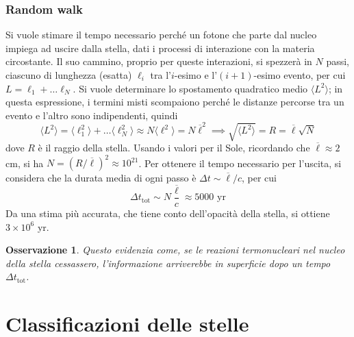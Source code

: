 \documentclass[11pt, a4paper]{scrartcl}
\theoremstyle{style}
\newtheorem{osservazione}{Osservazione}[section]
\theoremstyle{style1}
\numberwithin{equation}{subsection}
\begin{document}
\subsubsection{Random walk}

Si vuole stimare il tempo necessario perch\'e un fotone che parte dal nucleo impiega ad uscire dalla stella, dati i processi di interazione con la materia circostante.
Il suo cammino, proprio per queste interazioni, si spezzer\`a in $N$ passi, ciascuno di lunghezza (esatta) $\ell _i$ tra l'$i$-esimo e l'$(i+1)$-esimo evento, per cui $L = \ell _1 + \ldots \ell _N$.
Si vuole determinare lo spostamento quadratico medio $\langle L^2 \rangle$; in questa espressione, i termini misti scompaiono perch\'e le distanze percorse tra un evento e l'altro sono indipendenti, quindi
\[
\langle L^2 \rangle = \langle \ell _1^2 \rangle + \ldots \langle \ell _{N} ^2 \rangle \approx N \langle  \ell ^2 \rangle = N \overline{\ell }^2\implies \sqrt{\langle L^2 \rangle}  = R = \overline{\ell } \sqrt{N} 
\] 
dove $R$ \`e il raggio della stella.
Usando i valori per il Sole, ricordando che $\overline{\ell }\approx 2$ cm, si ha $N = \left(R / \overline{\ell }\right) ^2 \approx 10^{21}$.
Per ottenere il tempo necessario per l'uscita, si considera che la durata media di ogni passo \`e $\Delta t \sim \overline{\ell } / c$, per cui
\[
\Delta t_\text{tot} \sim N \frac{\overline{\ell }}{c} \approx 5000 \text{ yr}
\] 
Da una stima pi\`u accurata, che tiene conto dell'opacit\`a della stella, si ottiene $3 \times 10^6$ yr.
\begin{osservazione}
Questo evidenzia come, se le reazioni termonucleari nel nucleo della stella cessassero, l'informazione arriverebbe in superficie dopo un tempo $\Delta t _\text{tot}$.
\end{osservazione}




















\newpage 

\section{Classificazioni delle stelle}
\end{document}
